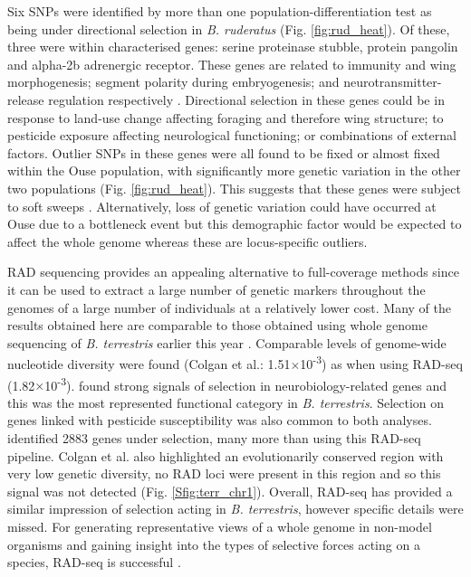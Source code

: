 \documentclass[12pt]{article}
\begin{document}
\begin{linenumbers}
    Six SNPs were identified by more than one population-differentiation test as being under directional selection in \emph{B. ruderatus} (Fig. \ref{fig:rud_heat}). Of these, three were within characterised genes: serine proteinase stubble, protein pangolin and alpha-2b adrenergic receptor. 
    These genes are related to immunity and wing morphogenesis; segment polarity during embryogenesis; and neurotransmitter-release regulation respectively \citep{brunner_pangolin_1997, bayer_genetic_2003, zou_comparative_2006, fujita_proteomic_2013}.
    Directional selection in these genes could be in response to land-use change affecting foraging and therefore wing structure; to pesticide exposure affecting neurological functioning; or combinations of external factors. Outlier SNPs in these genes were all found to be fixed or almost fixed within the Ouse population, with significantly more genetic variation in the other two populations (Fig. \ref{fig:rud_heat}). This suggests that these genes were subject to soft sweeps \citep{hohenlohe_using_2010}. Alternatively, loss of genetic variation could have occurred at Ouse due to a bottleneck event but this demographic factor would be expected to affect the whole genome whereas these are locus-specific outliers.
    	
    	
    RAD sequencing provides an appealing alternative to full-coverage methods since it can be used to extract a large number of genetic markers throughout the genomes of a large number of individuals at a relatively lower cost. Many of the results obtained here are comparable to those obtained using whole genome sequencing of \emph{B. terrestris} earlier this year \citep{colgan_genomic_2022}. Comparable levels of genome-wide nucleotide diversity were found (Colgan et al.: 1.51$\times$10\textsuperscript{-3}) as when using RAD-seq (1.82$\times$10\textsuperscript{-3}). \cite{colgan_genomic_2022} found strong signals of selection in neurobiology-related genes and this was the most represented functional category in \emph{B. terrestris}. Selection on genes linked with pesticide susceptibility was also common to both analyses. \cite{colgan_genomic_2022} identified 2883 genes under selection, many more than using this RAD-seq pipeline. 
    Colgan et al. also highlighted an evolutionarily conserved region with very low genetic diversity, no RAD loci were present in this region and so this signal was not detected (Fig. \ref{Sfig:terr_chr1}). Overall, RAD-seq has provided a similar impression of selection acting in \emph{B. terrestris}, however specific details were missed. For generating representative views of a whole genome in non-model organisms and gaining insight into the types of selective forces acting on a species, RAD-seq is successful \citep{catchen_unbroken_2017}. 
    	

\end{linenumbers}
\end{document}
